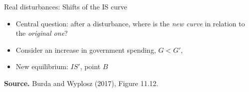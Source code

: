 \documentclass{beamer}
\newcommand{\tb}[1]{{\color{blue}{\textbf{#1}}}}
\begin{document}
\begin{frame}{Real disturbances: Shifts of the IS curve}

\begin{itemize}
\footnotesize
\item Central question: after a disturbance, where is the \emph{new curve} in relation to the \emph{original one}?
\item Consider an increase in government spending, $G<G'$, 
\item New equilibrium: $IS'$, point $B$
\end{itemize}

\begin{center}

\begin{figure}[h!]
	
\end{figure}

\begin{minipage}{0.6\columnwidth}
\tiny	
\textbf{Source.} Burda and Wyplosz (2017), Figure 11.12.\\
\end{minipage}
\end{center}

\end{frame}
\end{document}
